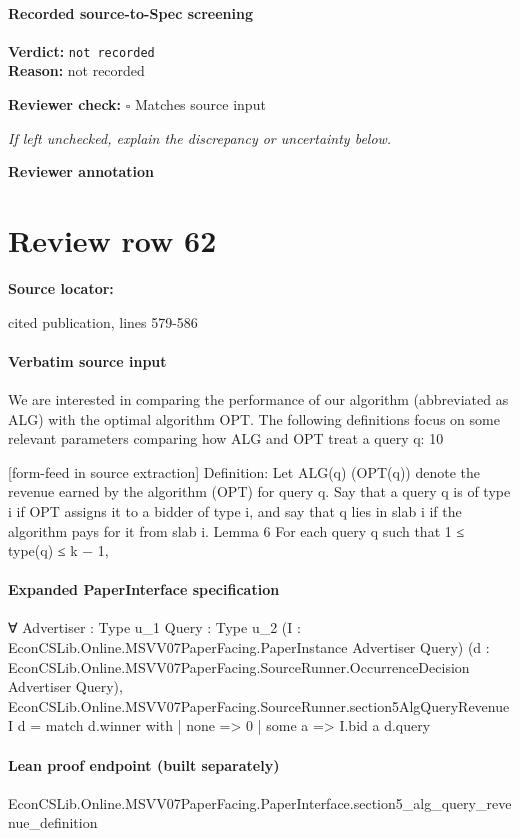 \documentclass[10pt]{article}
\newcommand{\reviewerbox}{%
  \par\noindent\fbox{\parbox{0.96\linewidth}{\rule{0pt}{0.38in}}}\par
}
\newcommand{\reviewmatch}[1]{%
  \par\noindent\textbf{Reviewer check:} $\square$\; #1\par
  \noindent\emph{If left unchecked, explain the discrepancy or uncertainty below.}\par
}
\begin{document}
\paragraph{Recorded source-to-Spec screening}
\textbf{Verdict:} \texttt{not recorded}
\\
\textbf{Reason:} not recorded
\reviewmatch{Matches source input}
\noindent\textbf{Reviewer annotation}\par
\reviewerbox
\clearpage
\hypertarget{source-claim-d8b1335948eb558d}{}
\section*{Review row 62}
\textbf{Source locator:} {\footnotesize\raggedright cited publication, lines 579-\allowbreak{}586\par}
\paragraph{Verbatim source input}
\begin{ReviewVerbatim}
We are interested in comparing the performance of our algorithm (abbreviated as ALG) with
the optimal algorithm OPT. The following definitions focus on some relevant parameters comparing how ALG and OPT treat a query q:
10


[form-feed in source extraction]
Definition: Let ALG(q) (OPT(q)) denote the revenue earned by the algorithm (OPT) for
query q. Say that a query q is of type i if OPT assigns it to a bidder of type i, and say that q
lies in slab i if the algorithm pays for it from slab i.
Lemma 6 For each query q such that 1 ≤ type(q) ≤ k − 1,
\end{ReviewVerbatim}


\paragraph{Expanded PaperInterface specification}
\begin{ReviewVerbatim}
∀ {Advertiser : Type u_1} {Query : Type u_2} (I : EconCSLib.Online.MSVV07PaperFacing.PaperInstance Advertiser Query)
  (d : EconCSLib.Online.MSVV07PaperFacing.SourceRunner.OccurrenceDecision Advertiser Query),
  EconCSLib.Online.MSVV07PaperFacing.SourceRunner.section5AlgQueryRevenue I d =
    match d.winner with
    | none => 0
    | some a => I.bid a d.query
\end{ReviewVerbatim}

\paragraph{Lean proof endpoint (built separately)}\begin{ReviewVerbatim}
EconCSLib.Online.MSVV07PaperFacing.PaperInterface.section5_alg_query_revenue_definition
\end{ReviewVerbatim}
\end{document}
